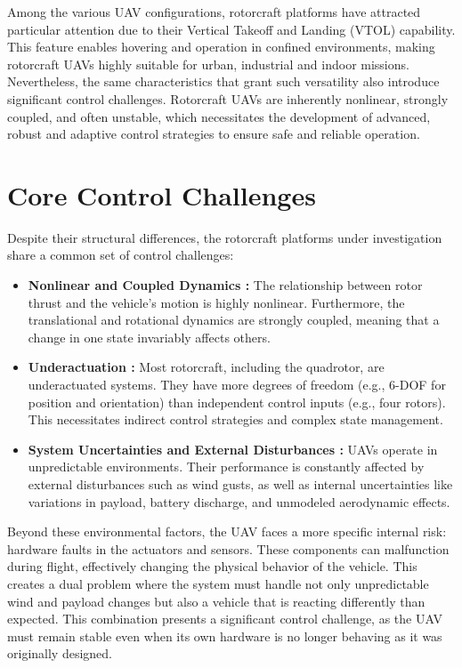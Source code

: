 Among the various UAV configurations, rotorcraft platforms have attracted particular attention due to their Vertical Takeoff and Landing (VTOL) capability. This feature enables hovering and operation in confined environments, making rotorcraft UAVs highly suitable for urban, industrial and indoor missions. Nevertheless, the same characteristics that grant such versatility also introduce significant control challenges. Rotorcraft UAVs are inherently nonlinear, strongly coupled, and often unstable, which necessitates the development of advanced, robust and adaptive control strategies to ensure safe and reliable operation.


\section{Core Control Challenges}
\label{sec:intro_challenge}

Despite their structural differences, the rotorcraft platforms under investigation share a common set of control challenges:
\begin{itemize}
    \item \textbf{Nonlinear and Coupled Dynamics \cite{NonlinearCoupledDynamics1,NonlinearCoupledDynamics2}:} The relationship between rotor thrust and the vehicle's motion is highly nonlinear. Furthermore, the translational and rotational dynamics are strongly coupled, meaning that a change in one state invariably affects others.
    \item \textbf{Underactuation \cite{Underactuation1,Underactuation2}:} Most rotorcraft, including the quadrotor, are underactuated systems. They have more degrees of freedom (e.g., 6-DOF for position and orientation) than independent control inputs (e.g., four rotors). This necessitates indirect control strategies and complex state management.
    \item \textbf{System Uncertainties and External Disturbances \cite{ExternalDisturbances1,ExternalDisturbances2}:} UAVs operate in unpredictable environments. Their performance is constantly affected by external disturbances such as wind gusts, as well as internal uncertainties like variations in payload, battery discharge, and unmodeled aerodynamic effects.
\end{itemize}

Beyond these environmental factors, the UAV faces a more specific internal risk: hardware faults in the actuators and sensors. These components can malfunction during flight, effectively changing the physical behavior of the vehicle. This creates a dual problem where the system must handle not only unpredictable wind and payload changes but also a vehicle that is reacting differently than expected. This combination presents a significant control challenge, as the UAV must remain stable even when its own hardware is no longer behaving as it was originally designed.

